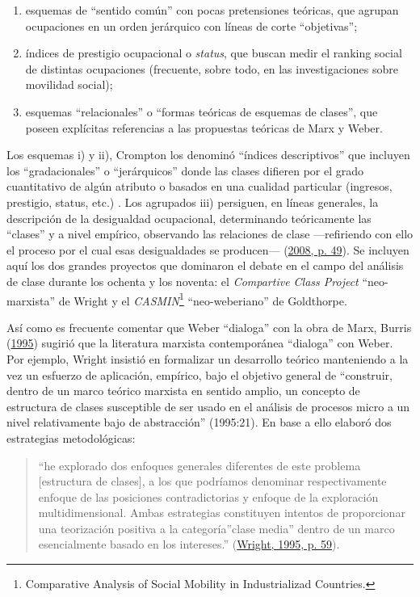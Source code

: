 \documentclass[
]{article}
\providecommand{\tightlist}{%
  \setlength{\itemsep}{0pt}\setlength{\parskip}{0pt}}
\begin{document}
\begin{enumerate}
\def\labelenumi{\roman{enumi}.}
\tightlist
\item
  esquemas de ``sentido común'' con pocas pretensiones teóricas, que agrupan ocupaciones en un orden jerárquico con líneas de corte ``objetivas'';
\item
  índices de prestigio ocupacional o \emph{status}, que buscan medir el ranking social de distintas ocupaciones (frecuente, sobre todo, en las investigaciones sobre movilidad social);
\item
  esquemas ``relacionales'' o ``formas teóricas de esquemas de clases'', que poseen explícitas referencias a las propuestas teóricas de Marx y Weber.
\end{enumerate}

Los esquemas i) y ii), Crompton los denominó ``índices descriptivos'' que incluyen los ``gradacionales'' o ``jerárquicos'' donde las clases difieren por el grado cuantitativo de algún atributo o basados en una cualidad particular (ingresos, prestigio, status, etc.) . Los agrupados iii) persiguen, en líneas generales, la descripción de la desigualdad ocupacional, determinando teóricamente las ``clases'' y a nivel empírico, observando las relaciones de clase ---refiriendo con ello el proceso por el cual esas desigualdades se producen--- (\protect\hyperlink{ref-Crompton2008}{2008, p. 49}). Se incluyen aquí los dos grandes proyectos que dominaron el debate en el campo del análisis de clase durante los ochenta y los noventa: el \emph{Compartive Class Project} ``neo-marxista'' de Wright y el \emph{CASMIN}\footnote{Comparative Analysis of Social Mobility in Industrializad Countries.} ``neo-weberiano'' de Goldthorpe.

Así como es frecuente comentar que Weber ``dialoga'' con la obra de Marx, Burris (\protect\hyperlink{ref-Burris1995}{1995}) sugirió que la literatura marxista contemporánea ``dialoga'' con Weber. Por ejemplo, Wright insistió en formalizar un desarrollo teórico manteniendo a la vez un esfuerzo de aplicación, empírico, bajo el objetivo general de ``construir, dentro de un marco teórico marxista en sentido amplio, un concepto de estructura de clases susceptible de ser usado en el análisis de procesos micro a un nivel relativamente bajo de abstracción'' (1995:21). En base a ello elaboró dos estrategias metodológicas:

\begin{quote}
``he explorado dos enfoques generales diferentes de este problema {[}estructura de clases{]}, a los que podríamos denominar respectivamente enfoque de las posiciones contradictorias y enfoque de la exploración multidimensional. Ambas estrategias constituyen intentos de proporcionar una teorización positiva a la categoría''clase media'' dentro de un marco esencialmente basado en los intereses.'' (\protect\hyperlink{ref-Wright1995a}{Wright, 1995, p. 59}).
\end{quote}
\end{document}
